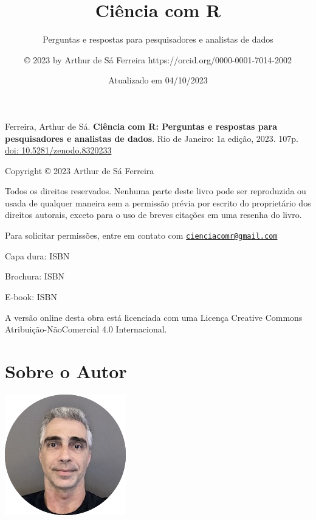 \documentclass[
]{book}
\title{\textbf{Ciência com R}}
\subtitle{Perguntas e respostas para pesquisadores e analistas de dados}
\author{© 2023 by Arthur de Sá Ferreira https://orcid.org/0000-0001-7014-2002}
\date{Atualizado em 04/10/2023}
\begin{document}
\maketitle


\newpage


\newpage

{
\setcounter{tocdepth}{1}
\tableofcontents
}
\mainmatter
\clearpage
\markboth{}{}

Ferreira, Arthur de Sá. \textbf{Ciência com R: Perguntas e respostas para pesquisadores e analistas de dados}. Rio de Janeiro: 1a edição, 2023. 107p. \href{https://zenodo.org/badge/latestdoi/685181979}{doi: 10.5281/zenodo.8320233}

\vspace*{\fill}

Copyright © 2023 Arthur de Sá Ferreira

Todos os direitos reservados. Nenhuma parte deste livro pode ser reproduzida ou usada de qualquer maneira sem a permissão prévia por escrito do proprietário dos direitos autorais, exceto para o uso de breves citações em uma resenha do livro.

Para solicitar permissões, entre em contato com \href{mailto:cienciacomr@gmail.com}{\nolinkurl{cienciacomr@gmail.com}}

Capa dura: ISBN

Brochura: ISBN

E-book: ISBN

A versão online desta obra está licenciada com uma Licença Creative Commons Atribuição-NãoComercial 4.0 Internacional.

\hypertarget{sobre-o-autor}{%
\chapter*{Sobre o Autor}\label{sobre-o-autor}}

\markboth{}{}

\includegraphics{ASF.png}
\end{document}
